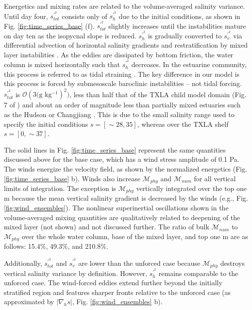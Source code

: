 \documentclass[draft]{agujournal2019}
\begin{document}
Energetics and mixing rates are related to the volume-averaged salinity variance. Until day four, $s_{tot}^{\prime^2}$ consists only of $s_{h}^{\prime^2}$ due to the initial conditions, as shown in Fig. \ref{fig:time_series_base} (f).  $s_{tot}^{\prime^2}$ slightly increases until the instabilities mature on day ten as the isopycnal slope is reduced.  $s_{h}^{\prime^2}$ is gradually converted to $s_{v}^{\prime^2}$ via differential advection of horizontal salinity gradients \cite{Li_2018} and restratification by mixed layer instabilities \cite{boccaletti2007mixed}. As the eddies are dissipated by bottom friction, the water column is mixed horizontally such that $s_{h}^{\prime^2}$ decreases. In the estuarine community, this process is referred to as tidal straining \cite{simpson1990tidal}. The key difference in our model is this process is forced by submesoscale baroclinic instabilities -- not tidal forcing. $s_{tot}^{\prime^2}$ is $\mathcal{O}(3 \text{(g kg}{^{-1}})^{2})$, less than half that of the TXLA child model domain (Fig. 7 of ) and about an order of magnitude less than partially mixed estuaries such as the Hudson or Changjiang \cite{Li_2018, Warner_2020}. This is due to the small salinity range used to specify the initial conditions $s = [\sim 28,35]$, whereas over the TXLA shelf $s = [0,\sim 37]$. 

The solid lines in Fig. \ref{fig:time_series_base} represent the same quantities discussed above for the base case, which has a wind stress amplitude of 0.1 Pa. The winds energize the velocity field, as shown by the normalized energetics (Fig. \ref{fig:time_series_base} b). Winds also increase $\mathcal{M}_{phy}$ and $\mathcal{M}_{num}$ for all vertical limits of integration. The exception is $\mathcal{M}_{phy}$ vertically integrated over the top one m because the mean vertical salinity gradient is decreased by the winds (e.g., Fig.  \ref{fig:wind_ensembles}). The nonlinear superinertial oscillations shown in the volume-averaged mixing quantities are qualitatively related to deepening of the mixed layer (not shown) and not discussed further. The ratio of bulk $\mathcal{M}_{num}$ to $\mathcal{M}_{phy}$ over the whole water column, base of the mixed layer, and top one m are as follows: 15.4\%, 49.3\%, and 210.8\%. 

Additionally, $s_{tot}^{\prime^2}$ and $s_{v}^{\prime^2}$ are lower than the unforced case because $\mathcal{M}_{phy}$ destroys vertical salinity variance by definition. However, $s_{h}^{\prime^2}$ remains comparable to the unforced case. The wind-forced eddies extend further beyond the initially stratified region and features sharper fronts relative to the unforced case (as approximated by $|\nabla_h s|$, Fig. \ref{fig:wind_ensembles} b).
\end{document}
